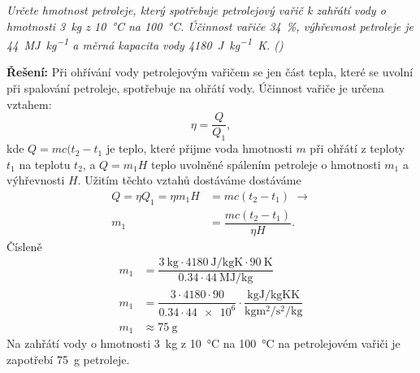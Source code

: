 \begin{mdframed}[style=mdexam]
  \begin{example}\label{FYZ:exam029}
    \emph{Určete hmotnost petroleje, který spotřebuje petrolejový vařič k zahřátí vody o hmotnosti
    \SI{3}{\kg} z \SI{10}{\degreeCelsius} na \SI{100}{\degreeCelsius}. Účinnost vařiče
    \SI{34}{\percent}, výhřevnost petroleje je \SI{44}{\mega\joule\per\kg} a měrná kapacita vody
    \SI{4180}{\joule\per\kg\kelvin}. (\cite[s.~31]{Bartuska1997})}
    

    {\centering
    \captionsetup{type=figure}
    \par} 
    
    \textbf{Řešení:}\newline 
    Při ohřívání vody petrolejovým vařičem se jen část tepla, které se uvolní při spalování
    petroleje, spotřebuje na ohřátí vody. Účinnost vařiče je určena vztahem:
    \begin{equation*}
      \eta = \dfrac{Q}{Q_1},
    \end{equation*}
    kde \(Q = mc(t_2 - t_1\) je teplo, které přijme voda  hmotnosti \(m\) při ohřátí z teploty
    \(t_1\) na teplotu \(t_2\), a \(Q=m_1H\) teplo uvolněné spálením petroleje o hmotnosti \(m_1\)
    a výhřevnosti \(H\). Užitím těchto vztahů dostáváme
    dostáváme
    \begin{align*}
     Q = \eta Q_1 = \eta m_1H &= mc(t_2-t_1) \;\rightarrow  \\
                               m_1 &= \dfrac{mc(t_2-t_1)}{\eta H}.
    \end{align*}
    Čísleně 
    \begin{align*}
       m_1 &= \dfrac{\SI{3}{\kg}\cdot\SI{4180}{\joule\per\kg\kelvin}\cdot\SI{90}{\kelvin}}
                    {\num{0.34}\cdot\SI{44}{\mega\joule\per\kg}}                                  \\
       m_1 &= \dfrac{3\cdot4180\cdot90}{\num{0.34}\cdot\num{44e6}}\cdot
              \dfrac{\si{\kg}\si{\joule\per\kg\kelvin}\si{\kelvin}}
                    {\si{\kg\square\m\per\square\s\per\kg}}                                       \\
       m_1 &\approx \SI{75}{\g}    
     \end{align*}
     Na zahřátí vody o hmotnosti \SI{3}{\kg} z \SI{10}{\degreeCelsius} na \SI{100}{\degreeCelsius}
     na petrolejovém vařiči je zapotřebí \SI{75}{\g} petroleje.
  \end{example} 
\end{mdframed}